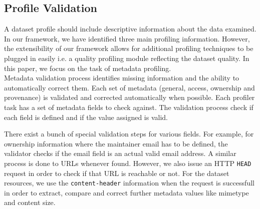 \documentclass[runningheads,a4paper]{llncs}
\begin{document}


\subsection{Profile Validation}

A dataset profile should include descriptive information about the data examined. In our framework, we have identified three main profiling information. However, the extensibility of our framework allows for additional profiling techniques to be plugged in easily i.e. a quality profiling module reflecting the dataset quality. In this paper, we focus on the task of metadata profiling.\\

Metadata validation process identifies missing information and the ability to automatically correct them. Each set of metadata (general, access, ownership and provenance) is validated and corrected automatically when possible. Each profiler task has a set of metadata fields to check against. The validation process check if each field is defined and if the value assigned is valid.

There exist a bunch of special validation steps for various fields. For example, for ownership information where the maintainer email has to be defined, the validator checks if the email field is an actual valid email address. A similar process is done to URLs whenever found. However, we also issue an HTTP \texttt{HEAD} request in order to check if that URL is reachable or not. For the dataset resources, we use the \texttt{content-header} information when the request is successfull in order to extract, compare and correct further metadata values like mimetype and content size.
\end{document}
